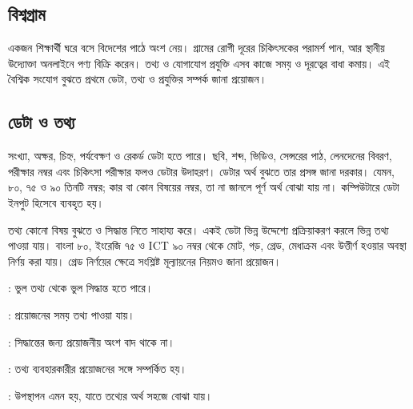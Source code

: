 \begin{topicbody}
\section{বিশ্বগ্রাম}
\label{sec:ch1-global-village}

একজন শিক্ষার্থী ঘরে বসে বিদেশের পাঠে অংশ নেয়। গ্রামের রোগী দূরের চিকিৎসকের পরামর্শ পান, আর স্থানীয় উদ্যোক্তা অনলাইনে পণ্য বিক্রি করেন। তথ্য ও যোগাযোগ প্রযুক্তি এসব কাজে সময় ও দূরত্বের বাধা কমায়। এই বৈশ্বিক সংযোগ বুঝতে প্রথমে ডেটা, তথ্য ও প্রযুক্তির সম্পর্ক জানা প্রয়োজন।

\subsection{ডেটা ও তথ্য}
\label{sec:ch1-data-information}
সংখ্যা, অক্ষর, চিহ্ন, পর্যবেক্ষণ ও রেকর্ড ডেটা হতে পারে। ছবি, শব্দ, ভিডিও, সেন্সরের পাঠ, লেনদেনের বিবরণ, পরীক্ষার নম্বর এবং চিকিৎসা পরীক্ষার ফলও ডেটার উদাহরণ। ডেটার অর্থ বুঝতে তার প্রসঙ্গ জানা দরকার। যেমন, ৮০, ৭৫ ও ৯০ তিনটি নম্বর; কার বা কোন বিষয়ের নম্বর, তা না জানলে পূর্ণ অর্থ বোঝা যায় না। কম্পিউটারে ডেটা ইনপুট হিসেবে ব্যবহৃত হয়।

তথ্য কোনো বিষয় বুঝতে ও সিদ্ধান্ত নিতে সাহায্য করে। একই ডেটা ভিন্ন উদ্দেশ্যে প্রক্রিয়াকরণ করলে ভিন্ন তথ্য পাওয়া যায়। বাংলা ৮০, ইংরেজি ৭৫ ও ICT ৯০ নম্বর থেকে মোট, গড়, গ্রেড, মেধাক্রম এবং উত্তীর্ণ হওয়ার অবস্থা নির্ণয় করা যায়। গ্রেড নির্ণয়ের ক্ষেত্রে সংশ্লিষ্ট মূল্যায়নের নিয়মও জানা প্রয়োজন।

\begin{compactpoints}
\item {}: ভুল তথ্য থেকে ভুল সিদ্ধান্ত হতে পারে।
\item {}: প্রয়োজনের সময় তথ্য পাওয়া যায়।
\item {}: সিদ্ধান্তের জন্য প্রয়োজনীয় অংশ বাদ থাকে না।
\item {}: তথ্য ব্যবহারকারীর প্রয়োজনের সঙ্গে সম্পর্কিত হয়।
\item {}: উপস্থাপন এমন হয়, যাতে তথ্যের অর্থ সহজে বোঝা যায়।
\end{compactpoints}


\end{topicbody}
